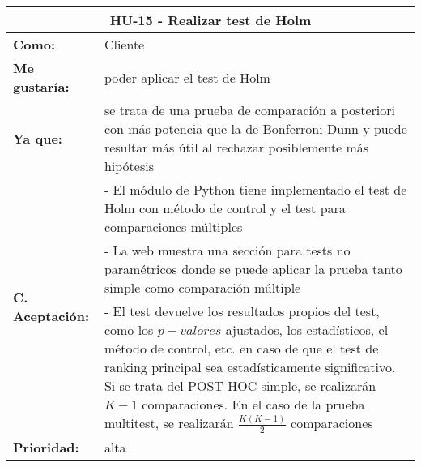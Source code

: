 \begin{table}[H]
	\begin{tabular}{| p{3cm}| p{12cm} |}
		\hline
		\multicolumn{2}{|c|}{\textbf{HU-15} - Realizar test de Holm} \\ \hline
		\textbf{Como:} & Cliente \\ \hline
		\textbf{Me gustaría:} & poder aplicar el test de Holm \\ \hline
		\textbf{Ya que:} & se trata de una prueba de comparación a posteriori con más potencia que la de Bonferroni-Dunn y puede resultar más útil al rechazar posiblemente más hipótesis \\ \hline
		\multirow{3}{12cm}{\textbf{C. Aceptación:}} & - El módulo de Python tiene implementado el test de Holm con método de control y el test para comparaciones múltiples \\
		& - La web muestra una sección para tests no paramétricos donde se puede aplicar la prueba tanto simple como comparación múltiple \\
		& - El test devuelve los resultados propios del test, como los $p-valores$ ajustados, los estadísticos, el método de control, etc. en caso de que el test de ranking principal sea estadísticamente significativo. Si se trata del POST-HOC simple, se realizarán $K-1$ comparaciones. En el caso de la prueba multitest, se realizarán $\frac{K(K-1)}{2}$ comparaciones \\ \hline
		\textbf{\textbf{Prioridad:}} & alta \\ \hline
	\end{tabular}
\end{table}


